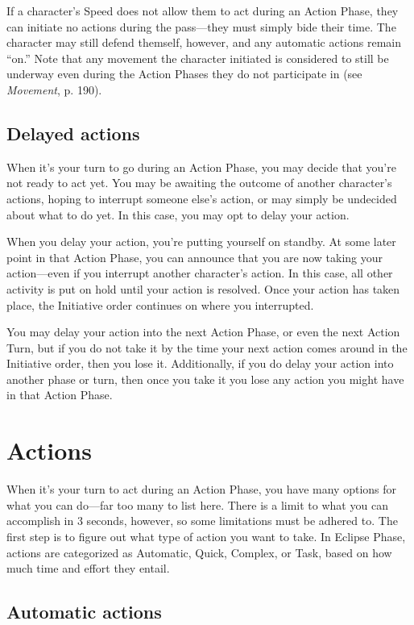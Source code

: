 If a character’s Speed does not allow them to act during an Action Phase, they can initiate no actions during the pass—they must simply bide their time. The character may still defend themself, however, and any automatic actions remain ``on.''  Note that any movement the character initiated is considered to still be underway even during the Action Phases they do not participate in (see \emph{Movement}, p. 190).


\subsection{Delayed actions}
\label{sec:delayed-actions}

When it’s your turn to go during an Action Phase, you may decide that you’re not ready to act yet. You may be awaiting the outcome of another character’s actions, hoping to interrupt someone else’s action, or may simply be undecided about what to do yet. In this case, you may opt to delay your action.

When you delay your action, you’re putting yourself on standby. At some later point in that Action Phase, you can announce that you are now taking your action—even if you interrupt another character’s action. In this case, all other activity is put on hold until your action is resolved. Once your action has taken place, the Initiative order continues on where you interrupted.

You may delay your action into the next Action Phase, or even the next Action Turn, but if you do not take it by the time your next action comes around in the Initiative order, then you lose it. Additionally, if you do delay your action into another phase or turn, then once you take it you lose any action you might have in that Action Phase.


\section{Actions}
\label{sec:actions}

When it’s your turn to act during an Action Phase, you have many options for what you can do—far too many to list here. There is a limit to what you can accomplish in 3 seconds, however, so some limitations must be adhered to. The first step is to figure out what type of action you want to take. In Eclipse Phase, actions are categorized as Automatic, Quick, Complex, or Task, based on how much time and effort they entail.


\subsection{Automatic actions}
\label{sec:automatic-actions}

